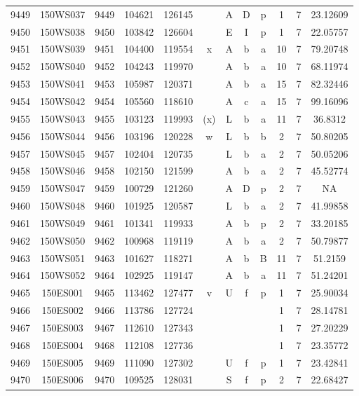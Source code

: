 \begin{tabular}{|*{12}{c|}}
9449 & 150WS037 & 9449 & 104621 & 126145 &  & A & D & p & 1 & 7 & 23.12609 \\ 
9450 & 150WS038 & 9450 & 103842 & 126604 &  & E & I & p & 1 & 7 & 22.05757 \\ 
9451 & 150WS039 & 9451 & 104400 & 119554 & x & A & b & a & 10 & 7 & 79.20748 \\ 
9452 & 150WS040 & 9452 & 104243 & 119970 &  & A & b & a & 10 & 7 & 68.11974 \\ 
9453 & 150WS041 & 9453 & 105987 & 120371 &  & A & b & a & 15 & 7 & 82.32446 \\ 
9454 & 150WS042 & 9454 & 105560 & 118610 &  & A & c & a & 15 & 7 & 99.16096 \\ 
9455 & 150WS043 & 9455 & 103123 & 119993 & (x) & L & b & a & 11 & 7 & 36.8312 \\ 
9456 & 150WS044 & 9456 & 103196 & 120228 & w & L & b & b & 2 & 7 & 50.80205 \\ 
9457 & 150WS045 & 9457 & 102404 & 120735 &  & L & b & a & 2 & 7 & 50.05206 \\ 
9458 & 150WS046 & 9458 & 102150 & 121599 &  & A & b & a & 2 & 7 & 45.52774 \\ 
9459 & 150WS047 & 9459 & 100729 & 121260 &  & A & D & p & 2 & 7 & NA \\ 
9460 & 150WS048 & 9460 & 101925 & 120587 &  & L & b & a & 2 & 7 & 41.99858 \\ 
9461 & 150WS049 & 9461 & 101341 & 119933 &  & A & b & p & 2 & 7 & 33.20185 \\ 
9462 & 150WS050 & 9462 & 100968 & 119119 &  & A & b & a & 2 & 7 & 50.79877 \\ 
9463 & 150WS051 & 9463 & 101627 & 118271 &  & A & b & B & 11 & 7 & 51.2159 \\ 
9464 & 150WS052 & 9464 & 102925 & 119147 &  & A & b & a & 11 & 7 & 51.24201 \\ 
9465 & 150ES001 & 9465 & 113462 & 127477 & v & U & f & p & 1 & 7 & 25.90034 \\ 
9466 & 150ES002 & 9466 & 113786 & 127724 &  &  &  &  & 1 & 7 & 28.14781 \\ 
9467 & 150ES003 & 9467 & 112610 & 127343 &  &  &  &  & 1 & 7 & 27.20229 \\ 
9468 & 150ES004 & 9468 & 112108 & 127736 &  &  &  &  & 1 & 7 & 23.35772 \\ 
9469 & 150ES005 & 9469 & 111090 & 127302 &  & U & f & p & 1 & 7 & 23.42841 \\ 
9470 & 150ES006 & 9470 & 109525 & 128031 &  & S & f & p & 2 & 7 & 22.68427 \\ 

\end{tabular}
